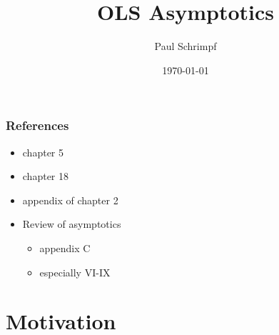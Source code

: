 \title{OLS Asymptotics}
\author{Paul Schrimpf} 
\date{\today}

\graphicspath{{figures/}}



\frame{\titlepage}

\begin{frame}
  \tableofcontents  
\end{frame}

\begin{frame}
  \frametitle{References}
  \begin{itemize}
  \item \cite{w2013} chapter 5
  \item \cite{sw2009} chapter 18
  \item \cite{ap2014} appendix of chapter 2 
  \item Review of asymptotics
    \begin{itemize}
    \item \cite{w2013} appendix C
    \item \cite{menzel2009}
      especially VI-IX
    \end{itemize}    
  \end{itemize}
\end{frame}


\section{Motivation}

